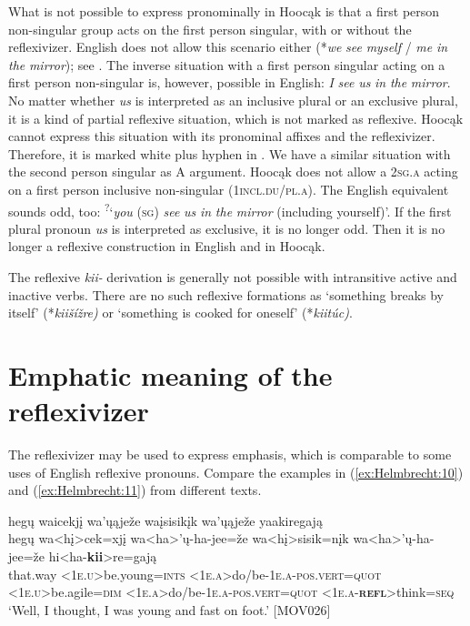 \documentclass[output=paper]{langscibook}
\begin{document}
What is not possible to express pronominally in Hoocąk is that a first person non-singular group acts on the first person singular, with or without the reflexivizer. English does not allow this scenario either (*\textit{we} \textit{see} \textit{myself} / \textit{me} \textit{in} \textit{the} \textit{mirror}); see \citet{HampeLehmann2013}. The inverse situation with a first person singular acting on a first person non-singular is, however, possible in English: \textit{I} \textit{see} \textit{us} \textit{in} \textit{the} \textit{mirror}. No matter whether \textit{us} is interpreted as an inclusive plural or an exclusive plural, it is a kind of partial reflexive situation, which is not marked as reflexive. Hoocąk cannot express this situation with its pronominal affixes and the reflexivizer. Therefore, it is marked white plus hyphen in . We have a similar situation with the second person singular as A argument. Hoocąk does not allow a 2\textsc{sg.a} acting on a first person inclusive non-singular (1\textsc{incl}.\textsc{du}/\textsc{pl.a}). The English equivalent sounds odd, too: \textsuperscript{?}{}`\textit{you} (\textsc{sg}) \textit{see} \textit{us} \textit{in} \textit{the} \textit{mirror} (including yourself)'. If the first plural pronoun \textit{us} is interpreted as exclusive, it is no longer odd. Then it is no longer a reflexive construction in English and in Hoocąk.

The reflexive \textit{kii-} derivation is generally not possible with intransitive active and inactive verbs. There are no such reflexive formations as `something breaks by itself' (*\textit{kiišížre)} or `something is cooked for oneself' (*\textit{kiitúc)}. 

\section{Emphatic meaning of the reflexivizer}\label{sec:Helmbrecht:3}

The reflexivizer may be used to express emphasis, which is comparable to some uses of English reflexive pronouns. Compare the examples in (\ref{ex:Helmbrecht:10}) and (\ref{ex:Helmbrecht:11}) from different texts.

\ea  \label{ex:Helmbrecht:10}
  \glll hegų waicekjį wa'ųąježe waįsisikįk wa'ųąježe yaakiregają \\
 {hegų} {wa<hį>cek=xjį} {wa<ha>'ų-ha-jee=že}  {wa<hį>sisik=nįk} {wa<ha>'ų-ha-jee=že} {hi<ha-\textbf{kii}>re=gają}\\
 {that.way} {<\textsc{1e.u}>be.young=\textsc{ints}} {<\textsc{1e.a}>do/be-\textsc{1e.a}-\textsc{pos.vert}=\textsc{quot}}   {<\textsc{1e.u}>be.agile=\textsc{dim}} {<\textsc{1e.a}>do/be-\textsc{1e.a}-\textsc{pos.vert}=\textsc{quot}}   {<\textsc{1e.a}-\textbf{\textsc{\textsc{refl}}}>think=\textsc{seq}}\\
	\glt `Well, I thought, I was young and fast on foot.' [MOV026]
\z 
 
\end{document}

